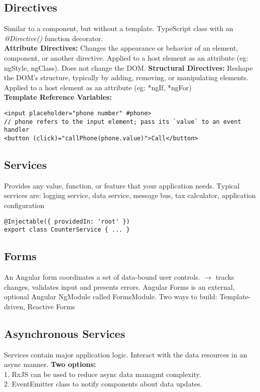 \subsection{Directives}
Similar to a component, but without a template. TypeScript class with an \textit{@Directive()} function decorator.\\
\textcolor{b}{\textbf{Attribute Directives:}} Changes the appearance or behavior of an element, component, or another directive. Applied to a host element as an attribute (eg: ngStyle, ngClass). Does not change the DOM. \textcolor{b}{\textbf{Structural Directives:}} Reshape the DOM's structure, typically by adding, removing, or manipulating elements. Applied to a host element as an attribute (eg: *ngIf, *ngFor)\\
\textcolor{b}{\textbf{Template Reference Variables:}}
\begin{lstlisting}[style=htmlcssjs]
<input placeholder="phone number" #phone>
// phone refers to the input element; pass its `value` to an event handler
<button (click)="callPhone(phone.value)">Call</button>
\end{lstlisting}
\subsection{Services}
Provides any value, function, or feature that your application needs. Typical services are: logging service, data service, message bus, tax calculator, application configuration
\begin{lstlisting}[style=htmlcssjs]
@Injectable({ providedIn: 'root' })
export class CounterService { ... }
\end{lstlisting}
\subsection{Forms}
An Angular form coordinates a set of data-bound user controls. $\rightarrow$ tracks changes, validates input and presents errors. Angular Forms is an external, optional Angular NgModule called FormsModule. Two ways to build: Template-driven, Reactive Forms
\subsection{Asynchronous Services}
Services contain major application logic. Interact with the data resources in an async manner. \textbf{Two options:}\\
1. RxJS can be used to reduce async data managmt complexity.\\
2. EventEmitter class to notify components about data updates.
